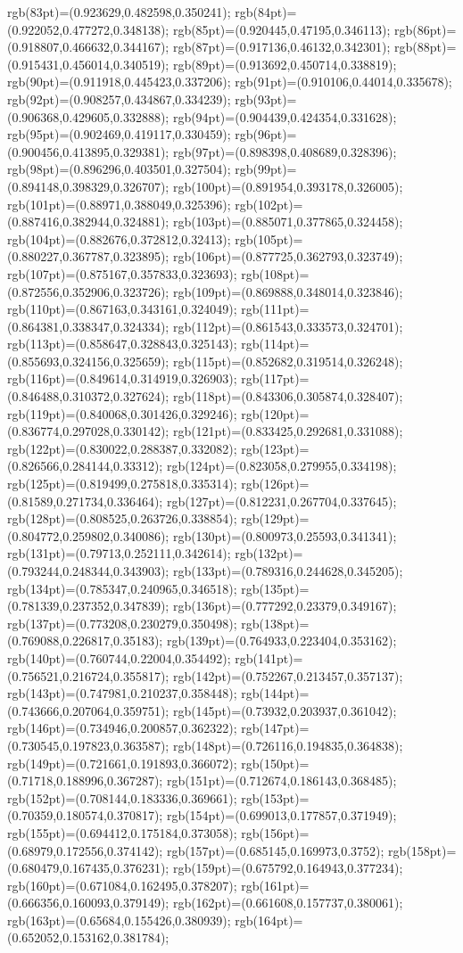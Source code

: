 rgb(83pt)=(0.923629,0.482598,0.350241); rgb(84pt)=(0.922052,0.477272,0.348138); rgb(85pt)=(0.920445,0.47195,0.346113); rgb(86pt)=(0.918807,0.466632,0.344167); rgb(87pt)=(0.917136,0.46132,0.342301); rgb(88pt)=(0.915431,0.456014,0.340519); rgb(89pt)=(0.913692,0.450714,0.338819); rgb(90pt)=(0.911918,0.445423,0.337206); rgb(91pt)=(0.910106,0.44014,0.335678); rgb(92pt)=(0.908257,0.434867,0.334239); rgb(93pt)=(0.906368,0.429605,0.332888); rgb(94pt)=(0.904439,0.424354,0.331628); rgb(95pt)=(0.902469,0.419117,0.330459); rgb(96pt)=(0.900456,0.413895,0.329381); rgb(97pt)=(0.898398,0.408689,0.328396); rgb(98pt)=(0.896296,0.403501,0.327504); rgb(99pt)=(0.894148,0.398329,0.326707); rgb(100pt)=(0.891954,0.393178,0.326005); rgb(101pt)=(0.88971,0.388049,0.325396); rgb(102pt)=(0.887416,0.382944,0.324881); rgb(103pt)=(0.885071,0.377865,0.324458); rgb(104pt)=(0.882676,0.372812,0.32413); rgb(105pt)=(0.880227,0.367787,0.323895); rgb(106pt)=(0.877725,0.362793,0.323749); rgb(107pt)=(0.875167,0.357833,0.323693); rgb(108pt)=(0.872556,0.352906,0.323726); rgb(109pt)=(0.869888,0.348014,0.323846); rgb(110pt)=(0.867163,0.343161,0.324049); rgb(111pt)=(0.864381,0.338347,0.324334); rgb(112pt)=(0.861543,0.333573,0.324701); rgb(113pt)=(0.858647,0.328843,0.325143); rgb(114pt)=(0.855693,0.324156,0.325659); rgb(115pt)=(0.852682,0.319514,0.326248); rgb(116pt)=(0.849614,0.314919,0.326903); rgb(117pt)=(0.846488,0.310372,0.327624); rgb(118pt)=(0.843306,0.305874,0.328407); rgb(119pt)=(0.840068,0.301426,0.329246); rgb(120pt)=(0.836774,0.297028,0.330142); rgb(121pt)=(0.833425,0.292681,0.331088); rgb(122pt)=(0.830022,0.288387,0.332082); rgb(123pt)=(0.826566,0.284144,0.33312); rgb(124pt)=(0.823058,0.279955,0.334198); rgb(125pt)=(0.819499,0.275818,0.335314); rgb(126pt)=(0.81589,0.271734,0.336464); rgb(127pt)=(0.812231,0.267704,0.337645); rgb(128pt)=(0.808525,0.263726,0.338854); rgb(129pt)=(0.804772,0.259802,0.340086); rgb(130pt)=(0.800973,0.25593,0.341341); rgb(131pt)=(0.79713,0.252111,0.342614); rgb(132pt)=(0.793244,0.248344,0.343903); rgb(133pt)=(0.789316,0.244628,0.345205); rgb(134pt)=(0.785347,0.240965,0.346518); rgb(135pt)=(0.781339,0.237352,0.347839); rgb(136pt)=(0.777292,0.23379,0.349167); rgb(137pt)=(0.773208,0.230279,0.350498); rgb(138pt)=(0.769088,0.226817,0.35183); rgb(139pt)=(0.764933,0.223404,0.353162); rgb(140pt)=(0.760744,0.22004,0.354492); rgb(141pt)=(0.756521,0.216724,0.355817); rgb(142pt)=(0.752267,0.213457,0.357137); rgb(143pt)=(0.747981,0.210237,0.358448); rgb(144pt)=(0.743666,0.207064,0.359751); rgb(145pt)=(0.73932,0.203937,0.361042); rgb(146pt)=(0.734946,0.200857,0.362322); rgb(147pt)=(0.730545,0.197823,0.363587); rgb(148pt)=(0.726116,0.194835,0.364838); rgb(149pt)=(0.721661,0.191893,0.366072); rgb(150pt)=(0.71718,0.188996,0.367287); rgb(151pt)=(0.712674,0.186143,0.368485); rgb(152pt)=(0.708144,0.183336,0.369661); rgb(153pt)=(0.70359,0.180574,0.370817); rgb(154pt)=(0.699013,0.177857,0.371949); rgb(155pt)=(0.694412,0.175184,0.373058); rgb(156pt)=(0.68979,0.172556,0.374142); rgb(157pt)=(0.685145,0.169973,0.3752); rgb(158pt)=(0.680479,0.167435,0.376231); rgb(159pt)=(0.675792,0.164943,0.377234); rgb(160pt)=(0.671084,0.162495,0.378207); rgb(161pt)=(0.666356,0.160093,0.379149); rgb(162pt)=(0.661608,0.157737,0.380061); rgb(163pt)=(0.65684,0.155426,0.380939); rgb(164pt)=(0.652052,0.153162,0.381784); 